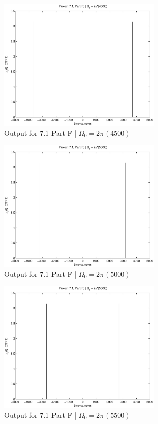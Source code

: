 \begin{figure}[!htbp]
  \centering
    \includegraphics[width=0.7\textwidth]{Part1/Output/Figures/proj71PartF-4500.eps}
  \caption{Output for 7.1 Part F | $\Omega_0 = 2\pi(4500)$ }
\end{figure}

\begin{figure}[!htbp]
  \centering
    \includegraphics[width=0.7\textwidth]{Part1/Output/Figures/proj71PartF-5000.eps}
  \caption{Output for 7.1 Part F | $\Omega_0 = 2\pi(5000)$ }
\end{figure}

\begin{figure}[!htbp]
  \centering
    \includegraphics[width=0.7\textwidth]{Part1/Output/Figures/proj71PartF-5500.eps}
  \caption{Output for 7.1 Part F | $\Omega_0 = 2\pi(5500)$ }
\end{figure}


\pagebreak
